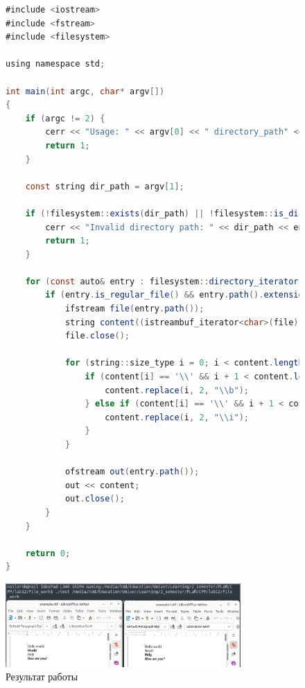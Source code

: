 \documentclass[a4paper, 14pt]{extarticle}
\begin{document}
\begin{figure}[!htb]
\begin{lstlisting}[language=Java,caption={Исходный код решения},label={lst:file_processing}]
#include <iostream>
#include <fstream>
#include <filesystem>

using namespace std;

int main(int argc, char* argv[])
{
    if (argc != 2) {
        cerr << "Usage: " << argv[0] << " directory_path" << endl;
        return 1;
    }

    const string dir_path = argv[1];

    if (!filesystem::exists(dir_path) || !filesystem::is_directory(dir_path)) {
        cerr << "Invalid directory path: " << dir_path << endl;
        return 1;
    }

    for (const auto& entry : filesystem::directory_iterator(dir_path)) {
        if (entry.is_regular_file() && entry.path().extension() == ".rtf") {
            ifstream file(entry.path());
            string content((istreambuf_iterator<char>(file)), istreambuf_iterator<char>());
            file.close();

            for (string::size_type i = 0; i < content.length(); i++) {
                if (content[i] == '\\' && i + 1 < content.length() && content[i + 1] == 'i') {
                    content.replace(i, 2, "\\b");
                } else if (content[i] == '\\' && i + 1 < content.length() && content[i + 1] == 'b') {
                    content.replace(i, 2, "\\i");
                }
            }

            ofstream out(entry.path());
            out << content;
            out.close();
        }
    }

    return 0;
}
\end{lstlisting}
\end{figure}


\begin{figure}[!htb]
	\centering
	\includegraphics[width=0.8\textwidth]{output.png}
\caption{Результат работы}
\label{fig:output}
\end{figure}
\end{document}
